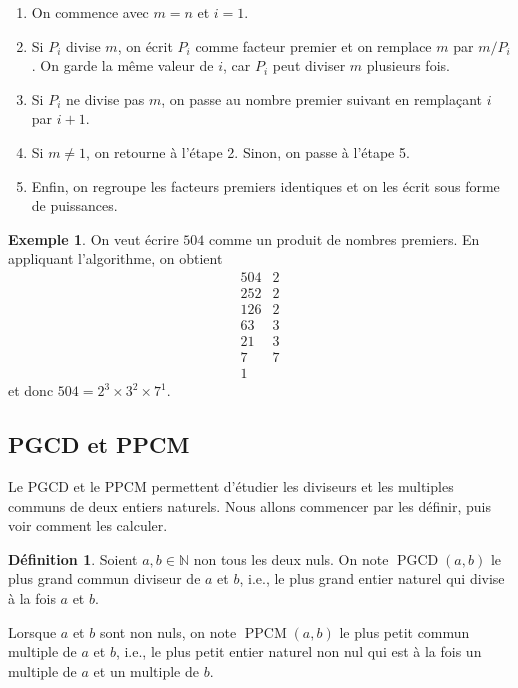 \documentclass[12pt,a4paper]{article}
\theoremstyle{plain}
\theoremstyle{definition}
\newtheorem{definition}[theorem]{Définition}
\newtheorem{example}[theorem]{Exemple}
\theoremstyle{remark}
\DeclareMathOperator{\ppcm}{PPCM}
\DeclareMathOperator{\pgcd}{PGCD}
\begin{document}
\begin{enumerate}
  \item On commence avec $m=n$ et $i=1$.
  \item Si $P_i$ divise $m$, on écrit $P_i$ comme facteur premier et
  on remplace $m$ par $m/P_i$. On garde la même valeur de $i$, car
  $P_i$ peut diviser $m$ plusieurs fois.
  \item Si $P_i$ ne divise pas $m$, on passe au nombre premier suivant
  en remplaçant $i$ par $i+1$.
  \item Si $m \neq 1$, on retourne à l'étape 2. Sinon, on passe à
l'étape 5. 
  \item Enfin, on regroupe les facteurs premiers identiques et on les
  écrit sous forme de puissances.
\end{enumerate}

\begin{example}
  On veut écrire $504$ comme un produit de nombres premiers. En
  appliquant l'algorithme, on obtient
  \[
  \begin{array}{r|l}
  504 & 2 \\
  252 & 2 \\
  126 & 2 \\
  63 & 3 \\
  21 & 3 \\
    7 & 7 \\
    1 &
  \end{array}
  \]
  et donc $504 = 2^3 \times 3^2 \times 7^1$.
\end{example}

\subsection{PGCD et PPCM}

Le PGCD et le PPCM permettent d'étudier les diviseurs et les multiples
communs de deux entiers naturels. Nous allons commencer par les définir,
puis voir comment les calculer.

\begin{tcolorbox}[navybar]
\begin{definition}
  Soient $a,b \in \mathbb{N}$ non tous les deux nuls. On note $\pgcd(a,b)$
  le plus grand commun diviseur de $a$ et $b$, i.e., le plus grand
  entier naturel qui divise à la fois $a$ et $b$.

  Lorsque $a$ et $b$ sont non nuls, on note $\ppcm(a,b)$ le plus petit
  commun multiple de $a$ et $b$, i.e., le plus petit entier naturel
  non nul qui est à la fois un multiple de $a$ et un multiple de $b$.
\end{definition}
\end{tcolorbox}
\end{document}
